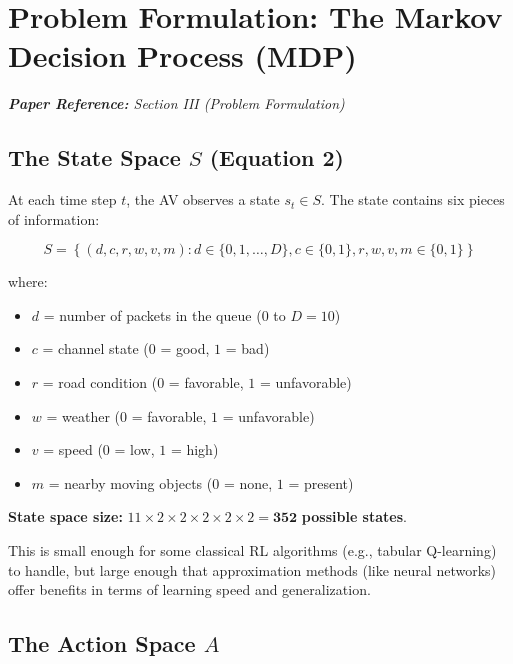 \documentclass[12pt,a4paper]{article}
\begin{document}
\section{Problem Formulation: The Markov Decision Process (MDP)}

\noindent\textit{\textbf{Paper Reference:} Section III (Problem Formulation)}

\subsection{The State Space $S$ (Equation 2)}

At each time step $t$, the AV observes a state $s_t \in S$. The state contains six pieces of information:

\begin{equation}
S = \left\{ (d, c, r, w, v, m) : d \in \{0, 1, \ldots, D\}, c \in \{0,1\}, r,w,v,m \in \{0,1\} \right\}
\end{equation}

\noindent where:
\begin{itemize}
    \item $d$ = number of packets in the queue ($0$ to $D = 10$)
    \item $c$ = channel state ($0$ = good, $1$ = bad)
    \item $r$ = road condition ($0$ = favorable, $1$ = unfavorable)
    \item $w$ = weather ($0$ = favorable, $1$ = unfavorable)
    \item $v$ = speed ($0$ = low, $1$ = high)
    \item $m$ = nearby moving objects ($0$ = none, $1$ = present)
\end{itemize}

\noindent\textbf{State space size:} $11 \times 2 \times 2 \times 2 \times 2 \times 2 = \mathbf{352}$ \textbf{possible states}.

This is small enough for some classical RL algorithms (e.g., tabular Q-learning) to handle, but large enough that approximation methods (like neural networks) offer benefits in terms of learning speed and generalization.

\subsection{The Action Space $A$}
\end{document}
